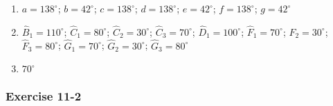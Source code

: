 {\begin{multicols}{3}
\begin{enumerate}[label=\textbf{\arabic*}.]
\item %
    $a=138^{\circ}$; $b=42^{\circ}$; $c=138^{\circ}$; $d=138^{\circ}$; $e=42^{\circ}$; $f=138^{\circ}$; $g=42^{\circ}$
\item %
 $\hat{B}_1=110^{\circ}$; $\hat{C}_1=80^{\circ}$; $\hat{C}_2=30^{\circ}$; $\hat{C}_3=70^{\circ}$; $\hat{D}_1=100^{\circ}$; $\hat{F}_1=70^{\circ}$; $\hat{F}_2=30^{\circ}$; $\hat{F}_3=80^{\circ}$; $\hat{G}_1=70^{\circ}$; $\hat{G}_2=30^{\circ}$; $\hat{G}_3=80^{\circ}$
\item $70^{\circ}$%
% 
\end{enumerate}

\subsubsection*{Exercise 11-2} %


\end{multicols}}
